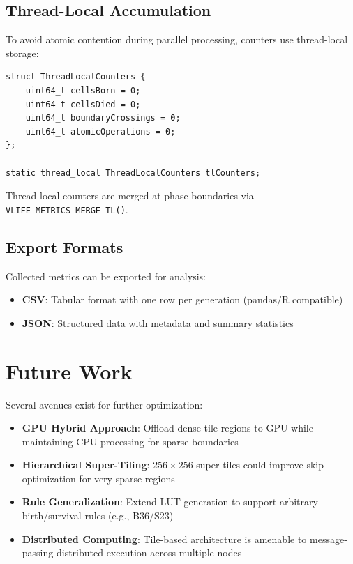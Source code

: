 \documentclass[11pt]{article}
\theoremstyle{definition}
\begin{document}
    \subsection{Thread-Local Accumulation}

    To avoid atomic contention during parallel processing, counters use thread-local storage:

    \begin{lstlisting}
struct ThreadLocalCounters {
    uint64_t cellsBorn = 0;
    uint64_t cellsDied = 0;
    uint64_t boundaryCrossings = 0;
    uint64_t atomicOperations = 0;
};

static thread_local ThreadLocalCounters tlCounters;
    \end{lstlisting}

    Thread-local counters are merged at phase boundaries via \texttt{VLIFE\_METRICS\_MERGE\_TL()}.

    \subsection{Export Formats}

    Collected metrics can be exported for analysis:

    \begin{itemize}
        \item \textbf{CSV}: Tabular format with one row per generation (pandas/R compatible)
        \item \textbf{JSON}: Structured data with metadata and summary statistics
    \end{itemize}

    \section{Future Work}

    Several avenues exist for further optimization:

    \begin{itemize}
        \item \textbf{GPU Hybrid Approach}: Offload dense tile regions to GPU while maintaining CPU processing for sparse boundaries
        \item \textbf{Hierarchical Super-Tiling}: $256 \times 256$ super-tiles could improve skip optimization for very sparse regions
        \item \textbf{Rule Generalization}: Extend LUT generation to support arbitrary birth/survival rules (e.g., B36/S23)
        \item \textbf{Distributed Computing}: Tile-based architecture is amenable to message-passing distributed execution across multiple nodes
    \end{itemize}
\end{document}
